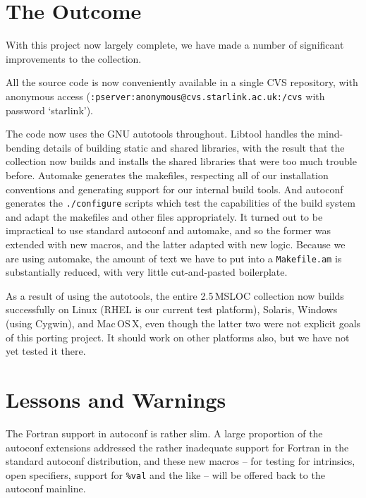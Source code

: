 \documentclass[11pt,twoside]{article}
\begin{document}



\section{The Outcome}
\label{s:result}

With this project now largely complete, we have made a number of
significant improvements to the collection.

All the source code is now conveniently available in a single CVS
repository, with anonymous access
(\texttt{:pserver:anonymous@cvs.starlink.ac.uk:/cvs} with password `starlink').

The code now uses the GNU autotools throughout.  Libtool handles the
mind-bending details of building static and shared libraries, with the
result that the collection now builds and installs the shared
libraries that were too much trouble before.  Automake generates the
makefiles, respecting all of our installation conventions and
generating support for our internal build tools.  And autoconf
generates the \texttt{./configure} scripts which test the capabilities
of the build system and adapt the makefiles and other files
appropriately.  It turned out to be impractical to use standard
autoconf and automake, and so the former was extended with new macros,
and the latter adapted with new logic.  Because we are using automake,
the amount of text we have to put into a \texttt{Makefile.am} is
substantially reduced, with very little cut-and-pasted boilerplate.

As a result of using the autotools, the entire 2.5\,MSLOC collection
now builds successfully on Linux (RHEL is our current test platform), Solaris,
Windows (using Cygwin), and Mac\,OS\,X, even though the latter two
were not explicit goals of this porting project.  It should work on
other platforms also, but we have not yet tested it there.



\section{Lessons and Warnings}
\label{s:lessons}

The Fortran support in autoconf is rather slim.  A large proportion of the
autoconf extensions addressed the rather inadequate support for
Fortran in the standard autoconf distribution, and these new macros -- for
testing for intrinsics, open specifiers, support for \texttt{\%val}
and the like -- will be offered back to the autoconf mainline.
\end{document}
